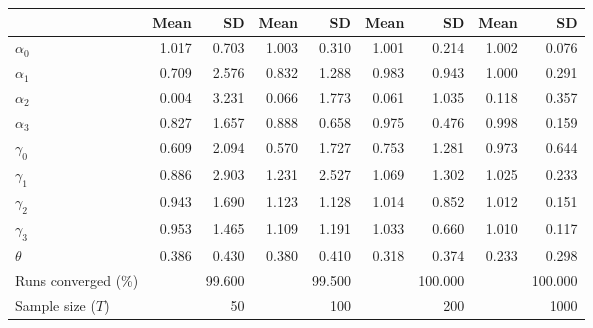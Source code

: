 
\begin{tabular}[t]{lrrrrrrrr}
\toprule
  & Mean & SD & Mean  & SD  & Mean   & SD   & Mean    & SD   \\
\midrule
$\alpha_{0}$ & 1.017 & 0.703 & 1.003 & 0.310 & 1.001 & 0.214 & 1.002 & 0.076\\
$\alpha_{1}$ & 0.709 & 2.576 & 0.832 & 1.288 & 0.983 & 0.943 & 1.000 & 0.291\\
$\alpha_{2}$ & 0.004 & 3.231 & 0.066 & 1.773 & 0.061 & 1.035 & 0.118 & 0.357\\
$\alpha_{3}$ & 0.827 & 1.657 & 0.888 & 0.658 & 0.975 & 0.476 & 0.998 & 0.159\\
$\gamma_{0}$ & 0.609 & 2.094 & 0.570 & 1.727 & 0.753 & 1.281 & 0.973 & 0.644\\
$\gamma_{1}$ & 0.886 & 2.903 & 1.231 & 2.527 & 1.069 & 1.302 & 1.025 & 0.233\\
$\gamma_{2}$ & 0.943 & 1.690 & 1.123 & 1.128 & 1.014 & 0.852 & 1.012 & 0.151\\
$\gamma_{3}$ & 0.953 & 1.465 & 1.109 & 1.191 & 1.033 & 0.660 & 1.010 & 0.117\\
$\theta$ & 0.386 & 0.430 & 0.380 & 0.410 & 0.318 & 0.374 & 0.233 & 0.298\\
Runs converged (\%) &  & 99.600 &  & 99.500 &  & 100.000 &  & 100.000\\
Sample size ($T$) &  & 50 &  & 100 &  & 200 &  & 1000\\
\bottomrule
\end{tabular}
